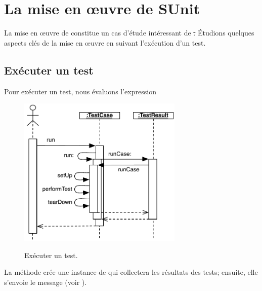 \documentclass[a4paper,10pt,twoside]{book}
\begin{document}
\section{La mise en {\oe}uvre de SUnit}

La mise en {\oe}uvre de \sunit constitue un cas d'étude intéressant de  \st.
Étudions quelques aspects clés de la mise en {\oe}uvre en suivant l'exécution d'un test.
\subsection{Exécuter un test}

Pour exécuter un test, nous évaluons l'expression 

\begin{figure}[tbh]
  \begin{center} 
		{\includegraphics[width=0.7\textwidth]{sunit-scenario}}
	\caption{Exécuter un test.}
  \end{center}
\end{figure}

La méthode  crée une instance de  qui collectera les résultats des tests; ensuite, elle s'envoie le message 
(voir ).
\end{document}
